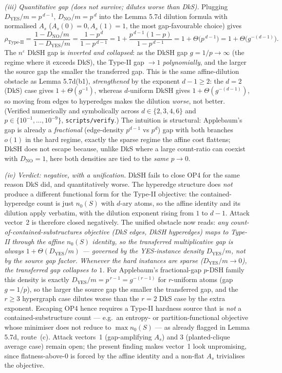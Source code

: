 \documentclass[
]{article}
\begin{document}
\emph{(iii) Quantitative gap (does not survive; dilutes worse than DkS).}
Plugging $D_{\mathrm{YES}}/m=p^{\,d-1}$, $D_{\mathrm{NO}}/m=p^{\,d}$ into
the Lemma 5.7d dilution formula with normalised $A_s$
($A_s(0)=0,A_s(1)=1$, the most gap-favourable choice) gives
\[
\rho_{\mathrm{Type\text{-}II}}
=\frac{1-D_{\mathrm{NO}}/m}{1-D_{\mathrm{YES}}/m}
=\frac{1-p^{\,d}}{1-p^{\,d-1}}
=1+\frac{p^{\,d-1}(1-p)}{1-p^{\,d-1}}
=1+\Theta\!\bigl(p^{\,d-1}\bigr)
=1+\Theta\!\bigl(g^{-(d-1)}\bigr).
\]
The $n^{\varepsilon}$ DkSH gap is \emph{inverted and collapsed}: as the
DkSH gap $g=1/p\to\infty$ (the regime where it exceeds DkS), the Type-II
gap $\to 1$ \emph{polynomially}, and the larger the source gap the
smaller the transferred gap. This is the same affine-dilution obstacle
as Lemma 5.7d(b1), \emph{strengthened} by the exponent $d-1\ge 2$: the
$d=2$ (DkS) case gives $1+\Theta(g^{-1})$, whereas $d$-uniform DkSH gives
$1+\Theta(g^{-(d-1)})$, so moving from edges to hyperedges makes the
dilution \emph{worse}, not better. (Verified numerically and
symbolically across $d\in\{2,3,4,6\}$ and $p\in\{10^{-1},\dots,10^{-9}\}$,
\texttt{scripts/verify}.) The intuition is structural: Applebaum's gap is
already a \emph{fractional} (edge-density $p^{d-1}$ vs $p^{d}$) gap with
both branches $o(1)$ in the hard regime, exactly the sparse regime the
affine cost flattens; DkSH does not escape because, unlike DkS where a
large count-ratio can coexist with $D_{\mathrm{NO}}=1$, here both
densities are tied to the \emph{same} $p\to 0$.

\emph{(iv) Verdict: negative, with a unification.} DkSH fails to close
OP4 for the same reason DkS did, and quantitatively worse. The hyperedge
structure does \emph{not} produce a different functional form for the
Type-II objective: the contained-hyperedge count is just $n_0(S)$ with
$d$-ary atoms, so the affine identity and its dilution apply verbatim,
with the dilution exponent rising from $1$ to $d-1$. Attack vector~2 is
therefore closed negatively. The unified obstacle now reads: \emph{any
count-of-contained-substructures objective (DkS edges, DkSH hyperedges)
maps to Type-II through the affine $n_0(S)$ identity, so the transferred
multiplicative gap is always $1+\Theta(D_{\mathrm{YES}}/m)$ --- governed
by the YES-instance \emph{density} $D_{\mathrm{YES}}/m$, not by the source
gap factor. Whenever the hard instances are sparse ($D_{\mathrm{YES}}/m
\to 0$), the transferred gap collapses to $1$.} For Applebaum's
fractional-gap $p$-DSH family this density is exactly
$D_{\mathrm{YES}}/m=p^{\,r-1}=g^{-(r-1)}$ for $r$-uniform atoms (gap
$g=1/p$), so the larger the source gap the smaller the transferred gap,
and the $r\ge 3$ hypergraph case dilutes worse than the $r=2$ DkS case
by the extra exponent. Escaping OP4 hence requires a Type-II hardness
source that is \emph{not} a contained-substructure count --- e.g.\ an
entropy- or partition-functional objective whose minimiser does not
reduce to $\max n_0(S)$ --- as already flagged in Lemma 5.7d, route~(c).
Attack vectors~1 (gap-amplifying $A_s$) and 3 (planted-clique average
case) remain open; the present finding makes vector~1 look unpromising,
since flatness-above-$0$ is forced by the affine identity and a non-flat
$A_s$ trivialises the objective.
\end{document}
